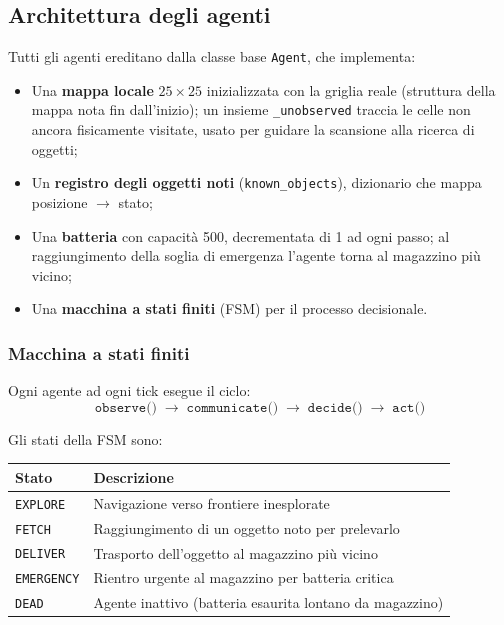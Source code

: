 \subsection{Architettura degli agenti}

Tutti gli agenti ereditano dalla classe base \texttt{Agent}, che implementa:

\begin{itemize}
  \item Una \textbf{mappa locale} $25 \times 25$ inizializzata con la griglia reale (struttura della mappa nota fin dall'inizio); un insieme \texttt{\_unobserved} traccia le celle non ancora fisicamente visitate, usato per guidare la scansione alla ricerca di oggetti;
  \item Un \textbf{registro degli oggetti noti} (\texttt{known\_objects}), dizionario che mappa posizione $\to$ stato;
  \item Una \textbf{batteria} con capacità 500, decrementata di 1 ad ogni passo; al raggiungimento della soglia di emergenza l'agente torna al magazzino più vicino;
  \item Una \textbf{macchina a stati finiti} (FSM) per il processo decisionale.
\end{itemize}

\subsubsection{Macchina a stati finiti}

Ogni agente ad ogni tick esegue il ciclo:
\[
\texttt{observe()} \;\to\; \texttt{communicate()} \;\to\; \texttt{decide()} \;\to\; \texttt{act()}
\]

Gli stati della FSM sono:

\begin{center}
\begin{tabular}{ll}
\toprule
\textbf{Stato} & \textbf{Descrizione} \\
\midrule
\texttt{EXPLORE}   & Navigazione verso frontiere inesplorate \\
\texttt{FETCH}     & Raggiungimento di un oggetto noto per prelevarlo \\
\texttt{DELIVER}   & Trasporto dell'oggetto al magazzino più vicino \\
\texttt{EMERGENCY} & Rientro urgente al magazzino per batteria critica \\
\texttt{DEAD}      & Agente inattivo (batteria esaurita lontano da magazzino) \\
\bottomrule
\end{tabular}
\end{center}

